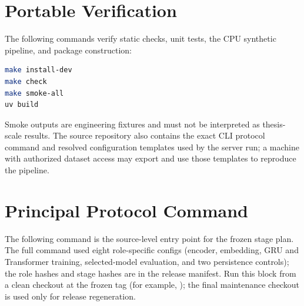 \section{Portable Verification}

The following commands verify static checks, unit tests, the CPU synthetic pipeline, and package
construction:

\begin{lstlisting}[language=bash,basicstyle=\ttfamily\small,breaklines=true]
make install-dev
make check
make smoke-all
uv build
\end{lstlisting}

Smoke outputs are engineering fixtures and must not be interpreted as thesis-scale results. The
source repository also contains the exact CLI protocol command and resolved configuration templates
used by the server run; a machine with authorized dataset access may export
 and use those templates to reproduce the pipeline.

\section{Principal Protocol Command}

The following command is the source-level entry point for the frozen stage plan. The full command
used eight role-specific configs (encoder, embedding, GRU and Transformer training, selected-model
evaluation, and two persistence controls); the role hashes and stage hashes are in the release
manifest.
Run this block from a clean checkout at the frozen tag (for example,
); the final maintenance checkout is used only for
release regeneration.

